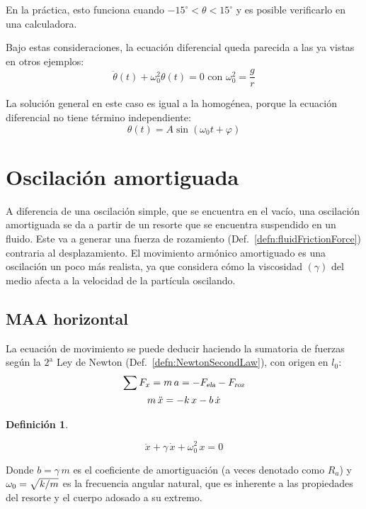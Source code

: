 \documentclass[a5paper,12pt,twoside]{book}
\newtheorem{defn}{{Definición}}[chapter]
\begin{document}
En la práctica, esto funciona cuando $-15^{\circ}<\theta<15^{\circ}$ y es posible verificarlo en una calculadora.

Bajo estas consideraciones, la ecuación diferencial queda parecida a las ya vistas en otros ejemplos:
\[ \ddot{\theta} (t) + \omega_0^2 \theta (t) = 0 \text{ con } \omega_0^2 = \frac{g}{r}\]

La solución general en este caso es igual a la homogénea, porque la ecuación diferencial no tiene término independiente:
\[ \theta(t) = A \sin(\omega_0 t + \varphi) \]


\section{Oscilación amortiguada}
A diferencia de una oscilación simple, que se encuentra en el vacío, una oscilación amortiguada se da a partir de un resorte que se encuentra suspendido en un fluido.
Este va a generar una fuerza de rozamiento (Def.\ \ref{defn:fluidFrictionForce}) contraria al desplazamiento.
El movimiento armónico amortiguado es una oscilación un poco más realista, ya que considera cómo la viscosidad $(\gamma)$ del medio afecta a la velocidad de la partícula oscilando.


\subsection{MAA horizontal}

La ecuación de movimiento se puede deducir haciendo la sumatoria de fuerzas según la $2^{\text{a}}$ Ley de Newton (Def.\ \ref{defn:NewtonSecondLaw}), con origen en $l_0$:
\begin{gather*}
    \sum F_x = m \, a = - {{F}_\textsl{{ela}}} - {{F}_\textsl{{roz}}}
    \\
    m \, \ddot{x} = - k \, x - b \, \dot{x}
\end{gather*}

\begin{mdframed}[style=MyFrame1]
    \begin{defn}
    \end{defn}
    \begin{equation*}
        \ddot{x} + \gamma \, \dot{x} + \omega_0^2 \, x  = 0
    \end{equation*}
\end{mdframed}

Donde $b=\gamma \, m$ es el coeficiente de amortiguación (a veces denotado como $R_a$) y $\omega_0=\sqrt{k/m}$ es la frecuencia angular natural, que es inherente a las propiedades del resorte y el cuerpo adosado a su extremo.
\end{document}
